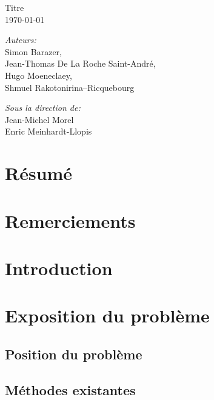 \documentclass[a4paper,11pt]{article}
\begin{document}
   	\begin{titlepage}
	\begin{center}
	\vspace*{\fill}

		\vspace{0.3cm}
		{\huge Titre}\\
		\vspace{1.5cm}
	\today
	\vspace{1.5cm}


		\large
			\emph{Auteurs:}\\
			Simon Barazer,\\
			Jean-Thomas De La Roche Saint-André,\\
			Hugo Moeneclaey, \\
			Shmuel Rakotonirina--Ricquebourg
		
\medbreak
\medbreak
\medbreak
\medbreak
\medbreak
\medbreak

		\large
			\emph{Sous la direction de:}\\ 
			Jean-Michel Morel \\
			Enric Meinhardt-Llopis
		


	\vfill
	\end{center}
   	\section*{Résumé}
   		
	\end{titlepage}
	\tableofcontents
		\section*{Remerciements}
	\section*{Introduction}%
		
	\section{Exposition du problème}
		\label{Exposition_du_probleme}
		\subsection{Position du problème}
		\subsection{Méthodes existantes}
\end{document}
